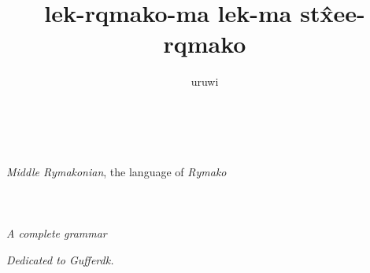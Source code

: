 \documentclass{book}
\title{lek-\bs{}rqmako-ma lek-ma st\^xee-\bs{}rqmako}
\author{uruwi}
\newcommand{\lname}{Middle Rymakonian}
\begin{document}
\pagecolor{Thistle!25}

\begin{titlepage}
    \makeatletter
    \begin{center}
        {\color{Orchid} \hprule \vspace{1.5ex} \\}
        {\Huge \kardinal \textcolor{Purple}{\@title} \\}
        {\large \textit{\lname}, the language of \textit{Rymako} \\}
        {\color{Orchid} \hprule \vspace{1.5ex} \\}
        \vspace{1.5cm}
        {\Large\bfseries \@author}\\[5pt]
        \vspace{2cm}
         \\[5pt]
        \emph{A complete grammar}\\[2cm]
        \vfill
        \vfill
        {\@date}
    \end{center}
    \makeatother
\end{titlepage}

\pagecolor{Thistle!15}

\begin{center}
    \textit{Dedicated to Gufferdk.}
\end{center}
\end{document}
